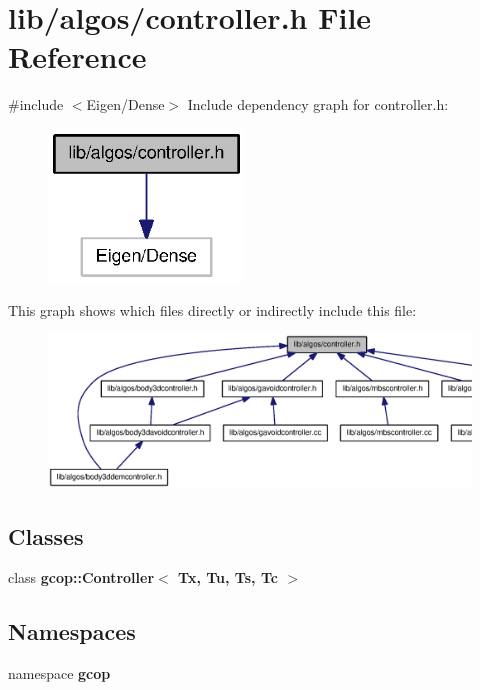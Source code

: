 \section{lib/algos/controller.h \-File \-Reference}
\label{controller_8h}
{\ttfamily \#include $<$\-Eigen/\-Dense$>$}\*
\-Include dependency graph for controller.\-h\-:
\nopagebreak
\begin{figure}[H]
\begin{center}
\leavevmode
\includegraphics[width=148pt]{controller_8h__incl}
\end{center}
\end{figure}
\-This graph shows which files directly or indirectly include this file\-:
\nopagebreak
\begin{figure}[H]
\begin{center}
\leavevmode
\includegraphics[width=350pt]{controller_8h__dep__incl}
\end{center}
\end{figure}
\subsection*{\-Classes}
\begin{DoxyCompactItemize}
\item 
class {\bf gcop\-::\-Controller$<$ Tx, Tu, Ts, Tc $>$}
\end{DoxyCompactItemize}
\subsection*{\-Namespaces}
\begin{DoxyCompactItemize}
\item 
namespace {\bf gcop}
\end{DoxyCompactItemize}
